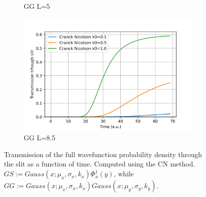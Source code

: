 \documentclass[11pt, a4paper]{article} %
\begin{document}
\begin{figure}[h!]
\begin{subfigure}[b]{0.25\linewidth}
    \caption{GG L=5}
  \end{subfigure}
    \begin{subfigure}[b]{0.24\linewidth}
    \includegraphics[width=\linewidth]{Transmission_GG_CN_L8.5.png}
    \caption{GG L=8.5}
  \end{subfigure}

  \caption{ Transmission of the full wavefunction probability density through the slit as a function of time. Computed using the CN method. $GS:=Gauss(x;\mu_x, \sigma_x, k_x)\Phi^1_x(y)$, while $GG:=Gauss(x;\mu_x, \sigma_x, k_x)Gauss(x;\mu_y, \sigma_y, k_y)$.\vspace{-0.25cm}}
  \label{fig:CNTransm}
\end{figure}
\end{document}
